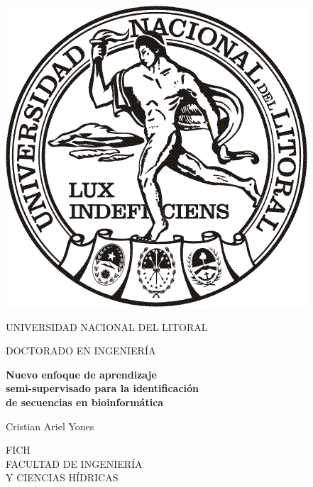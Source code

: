 \thispagestyle{empty}

\begin{flushright}
	\includegraphics[scale=0.2]{fig/logo_unl.png}
\end{flushright}
\vskip-2.5cm %
\textrm{ UNIVERSIDAD NACIONAL DEL LITORAL}

\vspace{2cm}

\begin{center}
	\noindent \textrm{\large DOCTORADO EN INGENIERÍA}
\end{center}

\vspace{2.5cm}


\noindent\textrm{\bf \huge Nuevo enfoque de aprendizaje}\\[0.2 cm]
\noindent\textrm{\bf \huge semi-supervisado para la identificación} \\[0.2 cm]
\noindent\textrm{\bf \huge de secuencias en bioinformática}

\vspace{1.5cm}

\noindent \textrm{{\LARGE Cristian Ariel Yones}}

\vspace{3cm}


\noindent \textrm{FICH} \\
\noindent \textrm{\small FACULTAD DE INGENIERÍA}\\
\noindent \textrm{\small Y CIENCIAS HÍDRICAS}
\vspace{0.4cm}

